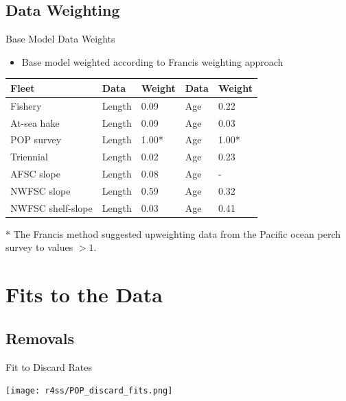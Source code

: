 \documentclass[pdf]{beamer}\usepackage[]{graphicx}\usepackage[]{color}
\begin{document}
\subsection{Data Weighting}
\begin{frame}{Base Model Data Weights}
  \begin{itemize}
    \item Base model weighted according to Francis weighting approach
  \end{itemize}
  
  \begin{table}[ht]
  \small
  \centering
  \begin{tabular}{p{1.2in}p{0.5in}p{0.5in}p{0.5in}p{0.5in}}
  Fleet & Data & Weight & Data & Weight \\ 
  \hline
  Fishery           & Length &  0.09  & Age & 0.22\\
  At-sea hake       & Length &  0.09  & Age & 0.03\\
  POP survey        & Length &  1.00* & Age & 1.00*\\
  Triennial         & Length &  0.02  & Age & 0.23\\
  AFSC slope        & Length &  0.08  & Age &    -\\
  NWFSC slope       & Length &  0.59  & Age & 0.32\\
  NWFSC shelf-slope & Length &  0.03  & Age & 0.41\\
  \hline
  \end{tabular}
  \end{table}
  * The Francis method suggested upweighting data from the Pacific ocean perch survey to values $> 1$. 
\end{frame}


\section{Fits to the Data}
\subsection{Removals}
\begin{frame}{Fit to Discard Rates}
  \begin{center}
    \texttt{[image: r4ss/POP\_discard\_fits.png]}
  \end{center}
\end{frame}
\end{document}
